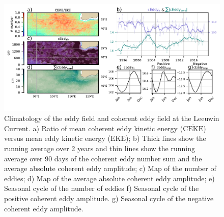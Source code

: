 \documentclass[draft,linenumbers]{agujournal2019}
\newcommand{\MEKE}{\overline{\textrm{EKE}}}
\newcommand{\MCEKE}{\overline{\textrm{CEKE}}}
\begin{document}
	\begin{figure}
	    \centering
	    \includegraphics[width=1\textwidth]{figures/regional_ratios_and_stats_V3_0.pdf}
	    \caption{ Climatology of the eddy field and coherent eddy field at the Leeuwin Current. a) Ratio of mean coherent eddy kinetic energy ($\MCEKE$) versus mean eddy kinetic energy ($\MEKE$); b) Thick lines show the running average over 2 years and thin lines show the running average over 90 days of the coherent eddy number sum and the average absolute coherent eddy amplitude; c) Map of the number of eddies; d) Map of the average absolute coherent eddy amplitude; e) Seasonal cycle of the number of eddies f) Seasonal cycle of the positive coherent eddy amplitude. g) Seasonal cycle of the negative coherent eddy amplitude.}
	    \label{fig:leeuwin_cycle}
	\end{figure}


\end{document}
